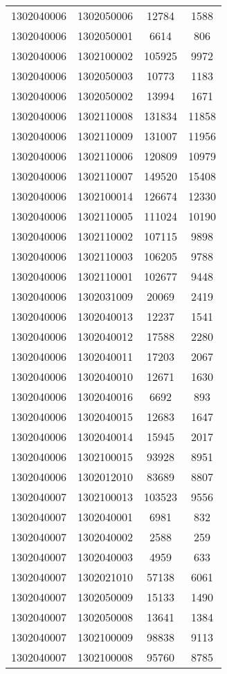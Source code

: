 \begin{longtable}{llcc}
1302040006 & 1302050006 & 12784 & 1588\\
1302040006 & 1302050001 & 6614 & 806\\
1302040006 & 1302100002 & 105925 & 9972\\
1302040006 & 1302050003 & 10773 & 1183\\
1302040006 & 1302050002 & 13994 & 1671\\
1302040006 & 1302110008 & 131834 & 11858\\
1302040006 & 1302110009 & 131007 & 11956\\
1302040006 & 1302110006 & 120809 & 10979\\
1302040006 & 1302110007 & 149520 & 15408\\
1302040006 & 1302100014 & 126674 & 12330\\
1302040006 & 1302110005 & 111024 & 10190\\
1302040006 & 1302110002 & 107115 & 9898\\
1302040006 & 1302110003 & 106205 & 9788\\
1302040006 & 1302110001 & 102677 & 9448\\
1302040006 & 1302031009 & 20069 & 2419\\
1302040006 & 1302040013 & 12237 & 1541\\
1302040006 & 1302040012 & 17588 & 2280\\
1302040006 & 1302040011 & 17203 & 2067\\
1302040006 & 1302040010 & 12671 & 1630\\
1302040006 & 1302040016 & 6692 & 893\\
1302040006 & 1302040015 & 12683 & 1647\\
1302040006 & 1302040014 & 15945 & 2017\\
1302040006 & 1302100015 & 93928 & 8951\\
1302040006 & 1302012010 & 83689 & 8807\\
1302040007 & 1302100013 & 103523 & 9556\\
1302040007 & 1302040001 & 6981 & 832\\
1302040007 & 1302040002 & 2588 & 259\\
1302040007 & 1302040003 & 4959 & 633\\
1302040007 & 1302021010 & 57138 & 6061\\
1302040007 & 1302050009 & 15133 & 1490\\
1302040007 & 1302050008 & 13641 & 1384\\
1302040007 & 1302100009 & 98838 & 9113\\
1302040007 & 1302100008 & 95760 & 8785\\

\end{longtable}
